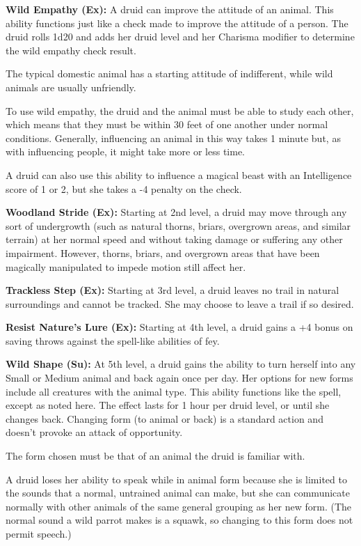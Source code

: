 \textbf{Wild Empathy (Ex):} A druid can improve the attitude of an animal. This ability functions just like a  check made to improve the attitude of a person. The druid rolls 1d20 and adds her druid level and her Charisma modifier to determine the wild empathy check result.

The typical domestic animal has a starting attitude of indifferent, while wild animals are usually unfriendly.

To use wild empathy, the druid and the animal must be able to study each other, which means that they must be within 30 feet of one another under normal conditions. Generally, influencing an animal in this way takes 1 minute but, as with influencing people, it might take more or less time.

A druid can also use this ability to influence a magical beast with an Intelligence score of 1 or 2, but she takes a -4 penalty on the check.

\textbf{Woodland Stride (Ex):} Starting at 2nd level, a druid may move through any sort of undergrowth (such as natural thorns, briars, overgrown areas, and similar terrain) at her normal speed and without taking damage or suffering any other impairment. However, thorns, briars, and overgrown areas that have been magically manipulated to impede motion still affect her.

\textbf{Trackless Step (Ex):} Starting at 3rd level, a druid leaves no trail in natural surroundings and cannot be tracked. She may choose to leave a trail if so desired.

\textbf{Resist Nature's Lure (Ex):} Starting at 4th level, a druid gains a +4 bonus on saving throws against the spell-like abilities of fey.

\textbf{Wild Shape (Su):} At 5th level, a druid gains the ability to turn herself into any Small or Medium animal and back again once per day. Her options for new forms include all creatures with the animal type. This ability functions like the  spell, except as noted here. The effect lasts for 1 hour per druid level, or until she changes back. Changing form (to animal or back) is a standard action and doesn't provoke an attack of opportunity.

The form chosen must be that of an animal the druid is familiar with. 

A druid loses her ability to speak while in animal form because she is limited to the sounds that a normal, untrained animal can make, but she can communicate normally with other animals of the same general grouping as her new form. (The normal sound a wild parrot makes is a squawk, so changing to this form does not permit speech.)

